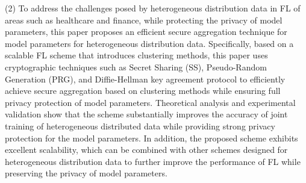 \begin{eabstract}
(2) To address the challenges posed by heterogeneous distribution data in FL of areas such as healthcare and finance, while protecting the privacy of model parameters, this paper proposes an efficient secure aggregation technique for model parameters for heterogeneous distribution data.
Specifically, based on a scalable FL scheme that introduces clustering methods, this paper uses cryptographic techniques such as Secret Sharing (SS), Pseudo-Random Generation (PRG), and Diffie-Hellman key agreement protocol to efficiently achieve secure aggregation based on clustering methods while ensuring full privacy protection of model parameters.
Theoretical analysis and experimental validation show that the scheme substantially improves the accuracy of joint training of heterogeneous distributed data while providing strong privacy protection for the model parameters.
In addition, the proposed scheme exhibits excellent scalability, which can be combined with other schemes designed for heterogeneous distribution data to further improve the performance of FL while preserving the privacy of model parameters.

\end{eabstract}

